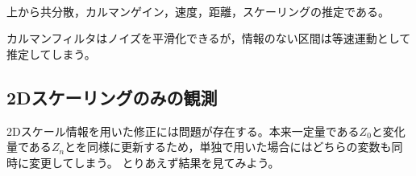 \documentclass[10pt,dvipdfmx,fleqn]{jarticle}
\begin{document}
    \begin{Verbatim}[commandchars=\\\{\}]


    \end{Verbatim}

    \begin{center}
    \end{center}
    { \hspace*{\fill} \\}
    
    \begin{center}
    \end{center}
    { \hspace*{\fill} \\}
    
    \begin{center}
    \end{center}
    { \hspace*{\fill} \\}
    
    \begin{center}
    \end{center}
    { \hspace*{\fill} \\}
    
    \begin{center}
    \end{center}
    { \hspace*{\fill} \\}
    
    上から共分散，カルマンゲイン，速度，距離，スケーリングの推定である。

カルマンフィルタはノイズを平滑化できるが，情報のない区間は等速運動として推定してしまう。

\subsection{2Dスケーリングのみの観測}\label{dux30b9ux30b1ux30fcux30eaux30f3ux30b0ux306eux307fux306eux89b3ux6e2c}

2Dスケール情報を用いた修正には問題が存在する。本来一定量である\(Z_0\)と変化量である\(Z_n\)とを同様に更新するため，単独で用いた場合にはどちらの変数も同時に変更してしまう。
とりあえず結果を見てみよう。
\end{document}
